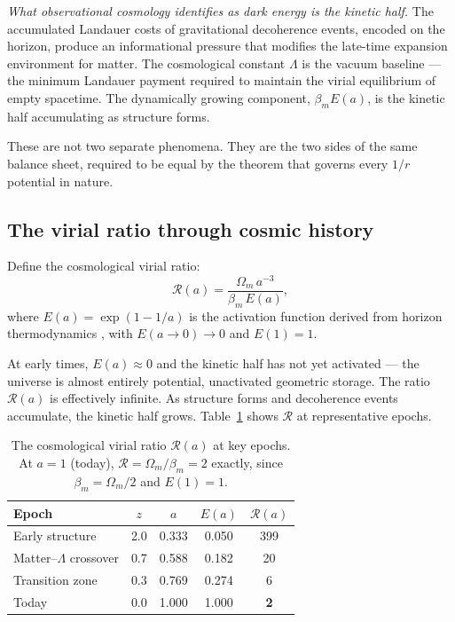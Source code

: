 \documentclass[12pt,a4paper]{article}
\begin{document}
\textit{What observational cosmology identifies as dark energy is the kinetic
half.} The accumulated Landauer costs of gravitational decoherence events,
encoded on the horizon, produce an informational pressure that modifies the
late-time expansion environment for matter. The cosmological constant $\Lambda$
is the vacuum baseline --- the minimum Landauer payment required to maintain
the virial equilibrium of empty spacetime. The dynamically growing component,
$\beta_m E(a)$, is the kinetic half accumulating as structure forms.

These are not two separate phenomena. They are the two sides of the same
balance sheet, required to be equal by the theorem that governs every $1/r$
potential in nature.

\subsection{The virial ratio through cosmic history}

Define the cosmological virial ratio:
\begin{equation}
  \mathcal{R}(a) = \frac{\Omega_m \, a^{-3}}{\beta_m \, E(a)},
  \label{eq:virial_ratio}
\end{equation}
where $E(a) = \exp(1 - 1/a)$ is the activation function derived from horizon
thermodynamics \citep{mahaffey2026}, with $E(a \to 0) \to 0$ and $E(1) = 1$.

At early times, $E(a) \approx 0$ and the kinetic half has not yet activated ---
the universe is almost entirely potential, unactivated geometric storage. The
ratio $\mathcal{R}(a)$ is effectively infinite. As structure forms and
decoherence events accumulate, the kinetic half grows. Table~\ref{tab:virial_ratio}
shows $\mathcal{R}$ at representative epochs.

\begin{table}[h]
\centering
\caption{The cosmological virial ratio $\mathcal{R}(a)$ at key epochs.
At $a = 1$ (today), $\mathcal{R} = \Omega_m / \beta_m = 2$ exactly, since
$\beta_m = \Omega_m/2$ and $E(1) = 1$.}
\label{tab:virial_ratio}
\begin{tabular}{lcccc}
\toprule
Epoch & $z$ & $a$ & $E(a)$ & $\mathcal{R}(a)$ \\
\midrule
Early structure & 2.0 & 0.333 & 0.050 & 399 \\
Matter--$\Lambda$ crossover & 0.7 & 0.588 & 0.182 & 20 \\
Transition zone & 0.3 & 0.769 & 0.274 & 6 \\
Today & 0.0 & 1.000 & 1.000 & \textbf{2} \\
\bottomrule
\end{tabular}
\end{table}
\end{document}
